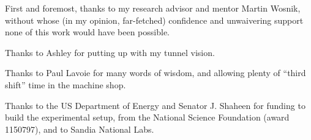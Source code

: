 



\begin{Acknowledgments}
\setlength{\baselineskip}{1.5\baselineskip} 
{ 
    
    First and foremost, thanks to my research advisor and mentor Martin Wosnik,
    without whose (in my opinion, far-fetched) confidence and unwaivering
    support none of this work would have been possible.
    
    Thanks to Ashley for putting up with my tunnel vision.
    
    Thanks to Paul Lavoie for many words of wisdom, and allowing plenty of
    ``third shift'' time in the machine shop.
    
    Thanks to the US Department of Energy and Senator J. Shaheen for funding to
    build the experimental setup, from the National Science Foundation (award
    1150797), and to Sandia National Labs.
    

}
\end{Acknowledgments}
